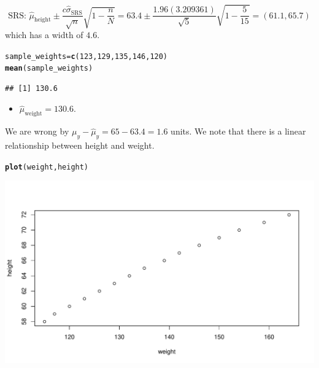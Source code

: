 \documentclass[oneside]{book}\usepackage[]{graphicx}\usepackage[dvipsnames,table,xcdraw]{xcolor}
\makeatletter
\def\maxwidth{ %
  \ifdim\Gin@nat@width>\linewidth
    \linewidth
  \else
    \Gin@nat@width
  \fi
}
\newcommand{\hlnum}[1]{\textcolor[rgb]{0.686,0.059,0.569}{#1}}%
\newcommand{\hlstd}[1]{\textcolor[rgb]{0.345,0.345,0.345}{#1}}%
\newcommand{\hlkwb}[1]{\textcolor[rgb]{0.69,0.353,0.396}{#1}}%
\newcommand{\hlkwd}[1]{\textcolor[rgb]{0.737,0.353,0.396}{\textbf{#1}}}%
\newenvironment{kframe}{%
 \def\at@end@of@kframe{}%
 \ifinner\ifhmode%
  \def\at@end@of@kframe{\end{minipage}}%
  \begin{minipage}{\columnwidth}%
 \fi\fi%
 \def\FrameCommand##1{\hskip\@totalleftmargin \hskip-\fboxsep
 \colorbox{shadecolor}{##1}\hskip-\fboxsep
     \hskip-\linewidth \hskip-\@totalleftmargin \hskip\columnwidth}%
 \MakeFramed {\advance\hsize-\width
   \@totalleftmargin\z@ \linewidth\hsize
   \@setminipage}}%
 {\par\unskip\endMakeFramed%
 \at@end@of@kframe}
\newenvironment{knitrout}{}{} %
\makeatother
\begin{document}
$$\text{SRS: }\hat{\mu}_\text{height}\pm \frac{c\hat{\sigma}_{\text{SRS}}}{\sqrt{n}}\sqrt{1-\frac{n}{N}}=63.4\pm \frac{1.96(3.209361)}{\sqrt{5}}\sqrt{1-\frac{5}{15}}=(61.1,65.7)$$
which has a width of $4.6$.


\begin{knitrout}
\color{fgcolor}\begin{kframe}
\begin{alltt}
\hlstd{sample_weights} \hlkwb{=} \hlkwd{c}\hlstd{(}\hlnum{123}\hlstd{,} \hlnum{129}\hlstd{,} \hlnum{135}\hlstd{,} \hlnum{146}\hlstd{,} \hlnum{120}\hlstd{)}
\hlkwd{mean}\hlstd{(sample_weights)}
\end{alltt}
\begin{verbatim}
## [1] 130.6
\end{verbatim}
\end{kframe}
\end{knitrout}
\begin{itemize}
    \item $\hat{\mu}_{\text{weight}}=130.6$.
\end{itemize}

We are wrong by $\mu_y-\hat{\mu}_y=65-63.4=1.6$ units. We note that
there is a linear relationship between height and weight.

\begin{knitrout}
\color{fgcolor}\begin{kframe}
\begin{alltt}
\hlkwd{plot}\hlstd{(weight, height)}
\end{alltt}
\end{kframe}

{\centering \includegraphics[width=\maxwidth]{figure/unnamed-chunk-33-1} 

}


\end{knitrout}
\end{document}

